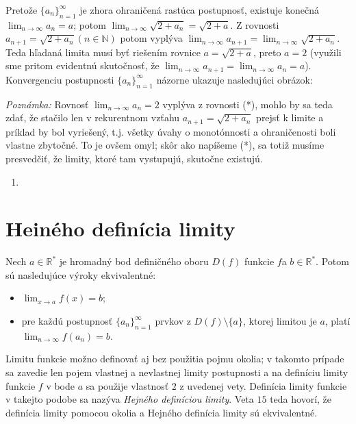 Pretože ${\{a_n\}}_{n=1}^\infty$ je zhora ohraničená rastúca postupnosť, existuje konečná $\lim_{n \rightarrow \infty} a_n=a$; potom $\lim_{n \rightarrow \infty}\sqrt{2+a_n}=\sqrt{2+a}$. Z rovnosti $a_{n+1}=\sqrt{2+a_n} (n \in \mathbb{N})$ potom vyplýva $\lim_{n \rightarrow \infty} a_{n+1}=\lim_{n \rightarrow \infty} \sqrt{2+a_n}$. Teda hľadaná limita musí byť riešením rovnice $a=\sqrt{2+a}$, preto $a=2$ (využili sme pritom evidentnú skutočnosť, že $\lim_{n \rightarrow \infty} a_{n+1}=\lim_{n \rightarrow \infty} a_n=a$). Konvergenciu postupnosti ${\{a_n\}}_{n=1}^\infty$ názorne ukazuje nasledujúci obrázok:

\textit{Poznámka:}
Rovnosť $\lim_{n \rightarrow \infty} a_n=2$ vyplýva z rovnosti (*), mohlo by sa teda zdať, že stačilo len v rekurentnom vzťahu $a_{n+1}=\sqrt{2+a_n}$ prejsť k limite a príklad by bol vyriešený, t.j. všetky úvahy o monotónnosti a ohraničenosti boli vlastne zbytočné. To je ovšem omyl; skôr ako napíšeme (*), sa totiž musíme presvedčiť, že limity, ktoré tam vystupujú, skutočne existujú.

\begin{enumerate}[resume]
	\item {}
\end{enumerate}

\section{Heiného definícia limity}
\begin{veta}
Nech $a \in \mathbb{R^*}$ je hromadný bod definičného oboru $D(f)$ funkcie $f$a $b \in \mathbb{R^*}$. Potom sú nasledujúce výroky ekvivalentné:
\begin{itemize}
\item $\lim_{x \rightarrow a} f(x)=b$;
\item pre každú postupnosť ${\{a_n\}}_{n=1}^\infty$ prvkov z $D(f)\setminus \{ a\}$, ktorej limitou je $a$, platí $\lim_{n \rightarrow \infty} f(a_n)=b$.
\end{itemize}
\end{veta}

Limitu funkcie možno definovať aj bez použitia pojmu okolia; v takomto prípade sa zavedie len pojem vlastnej a nevlastnej limity postupnosti a na definíciu limity funkcie $f$ v bode $a$ sa použije vlastnosť $2$ z uvedenej vety. Definícia limity funkcie v takejto podobe sa nazýva \textit{Hejného definíciou limity}. Veta $15$ teda hovorí, že definícia limity pomocou okolia a Hejného definícia limity sú ekvivalentné.

